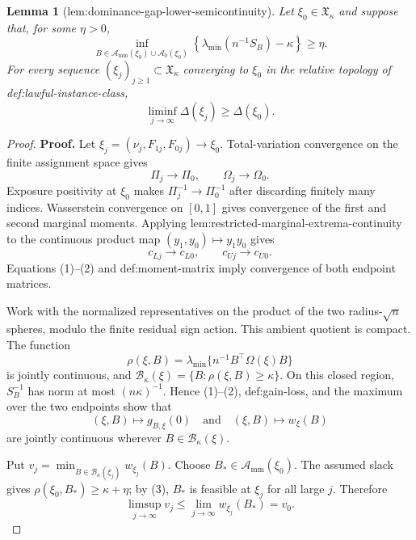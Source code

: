 \documentclass{article}
\newtheorem{lemma}{Lemma}
\begin{document}
\begin{lemma}[lem:dominance-gap-lower-semicontinuity]\label{lem:dominance-gap-lower-semicontinuity}
Let \(\xi_0\in\mathfrak X_\kappa\) and suppose that, for some \(\eta>0\),
\[
\inf_{B\in\mathcal A_{\mathrm{mm}}(\xi_0)\cup\mathcal A_0(\xi_0)}
\left\{\lambda_{\min}(n^{-1}S_B)-\kappa\right\}\ge\eta.
\]
For every sequence \((\xi_j)_{j\ge1}\subset\mathfrak X_\kappa\) converging to \(\xi_0\) in the relative topology of def:lawful-instance-class,
\[
\liminf_{j\to\infty}\Delta(\xi_j)\ge\Delta(\xi_0).
\]
\end{lemma}
\begin{proof}
\textbf{Proof.}
Let \(\xi_j=(\nu_j,F_{1j},F_{0j})\to\xi_0\).  Total-variation convergence on the finite assignment space gives
\[
\Pi_j\to\Pi_0,
\qquad
\Omega_j\to\Omega_0.
\tag{1}
\]
Exposure positivity at \(\xi_0\) makes \(\Pi_j^{-1}\to\Pi_0^{-1}\) after discarding finitely many indices.  Wasserstein convergence on \([0,1]\) gives convergence of the first and second marginal moments.  Applying lem:restricted-marginal-extrema-continuity to the continuous product map \((y_1,y_0)\mapsto y_1y_0\) gives
\[
c_{Lj}\to c_{L0},
\qquad
c_{Uj}\to c_{U0}.
\tag{2}
\]
Equations (1)--(2) and def:moment-matrix imply convergence of both endpoint matrices.

Work with the normalized representatives on the product of the two radius-\(\sqrt n\) spheres, modulo the finite residual sign action.  This ambient quotient is compact.  The function
\[
\rho(\xi,B)=\lambda_{\min}\{n^{-1}B^{\top}\Omega(\xi)B\}
\tag{3}
\]
is jointly continuous, and \(\mathcal B_\kappa(\xi)=\{B:\rho(\xi,B)\ge\kappa\}\).  On this closed region, \(S_B^{-1}\) has norm at most \((n\kappa)^{-1}\).  Hence (1)--(2), def:gain-loss, and the maximum over the two endpoints show that
\[
(\xi,B)\longmapsto g_{B,\xi}(0)
\quad\text{and}\quad
(\xi,B)\longmapsto w_\xi(B)
\tag{4}
\]
are jointly continuous wherever \(B\in\mathcal B_\kappa(\xi)\).

Put \(v_j=\min_{B\in\mathcal B_\kappa(\xi_j)}w_{\xi_j}(B)\).  Choose \(B_*\in\mathcal A_{\mathrm{mm}}(\xi_0)\).  The assumed slack gives \(\rho(\xi_0,B_*)\ge\kappa+\eta\); by (3), \(B_*\) is feasible at \(\xi_j\) for all large \(j\).  Therefore
\[
\limsup_{j\to\infty}v_j
\le\lim_{j\to\infty}w_{\xi_j}(B_*)
=v_0.
\tag{5}
\]


\end{proof}
\end{document}
